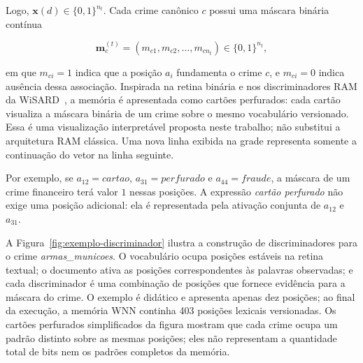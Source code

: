 Logo, $\mathbf{x}(d)\in\{0,1\}^{n_t}$. Cada crime canônico $c$ possui uma máscara binária contínua

\begin{equation}
\mathbf{m}_{c}^{(t)}=(m_{c1},m_{c2},\ldots,m_{cn_t})\in\{0,1\}^{n_t},
\end{equation}

em que $m_{ci}=1$ indica que a posição $a_i$ fundamenta o crime $c$, e $m_{ci}=0$ indica ausência dessa associação. Inspirada na retina binária e nos discriminadores RAM da WiSARD~\cite{rangel2016ssw,carneiro2017weightless}, a memória é apresentada como cartões perfurados: cada cartão visualiza a máscara binária de um crime sobre o mesmo vocabulário versionado. Essa é uma visualização interpretável proposta neste trabalho; não substitui a arquitetura RAM clássica. Uma nova linha exibida na grade representa somente a continuação do vetor na linha seguinte.

Por exemplo, se $a_{12}=\textit{cartao}$, $a_{31}=\textit{perfurado}$ e $a_{44}=\textit{fraude}$, a máscara de um crime financeiro terá valor $1$ nessas posições. A expressão \textit{cartão perfurado} não exige uma posição adicional: ela é representada pela ativação conjunta de $a_{12}$ e $a_{31}$.

A Figura~\ref{fig:exemplo-discriminador} ilustra a construção de discriminadores para o crime \textit{armas\_municoes}. O vocabulário ocupa posições estáveis na retina textual; o documento ativa as posições correspondentes às palavras observadas; e cada discriminador é uma combinação de posições que fornece evidência para a máscara do crime. O exemplo é didático e apresenta apenas dez posições; ao final da execução, a memória WNN continha 403 posições lexicais versionadas. Os cartões perfurados simplificados da figura mostram que cada crime ocupa um padrão distinto sobre as mesmas posições; eles não representam a quantidade total de bits nem os padrões completos da memória.

